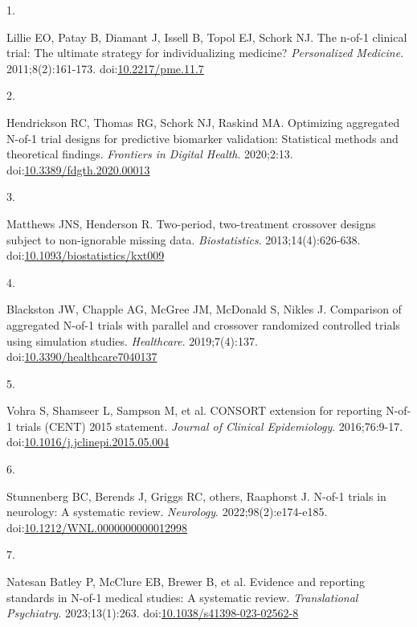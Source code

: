\documentclass[
  11pt,
]{article}
\newlength{\cslhangindent}
\newlength{\csllabelwidth}
\newenvironment{CSLReferences}[2] %
 {\begin{list}{}{%
  \setlength{\itemindent}{0pt}
  \setlength{\leftmargin}{0pt}
  \setlength{\parsep}{0pt}
  \ifodd #1
   \setlength{\leftmargin}{\cslhangindent}
   \setlength{\itemindent}{-1\cslhangindent}
  \fi
  \setlength{\itemsep}{#2\baselineskip}}}
 {\end{list}}
\newcommand{\CSLLeftMargin}[1]{\parbox[t]{\csllabelwidth}{\strut#1\strut}}
\newcommand{\CSLRightInline}[1]{\parbox[t]{\linewidth - \csllabelwidth}{\strut#1\strut}}
\begin{document}
\protect{}\label{refs}
\begin{CSLReferences}{0}{1}
\CSLLeftMargin{1. }%
\CSLRightInline{Lillie EO, Patay B, Diamant J, Issell B, Topol EJ, Schork NJ. The n-of-1 clinical trial: The ultimate strategy for individualizing medicine? \emph{Personalized Medicine}. 2011;8(2):161-173. doi:\href{https://doi.org/10.2217/pme.11.7}{10.2217/pme.11.7}}

\CSLLeftMargin{2. }%
\CSLRightInline{Hendrickson RC, Thomas RG, Schork NJ, Raskind MA. Optimizing aggregated {N}-of-1 trial designs for predictive biomarker validation: Statistical methods and theoretical findings. \emph{Frontiers in Digital Health}. 2020;2:13. doi:\href{https://doi.org/10.3389/fdgth.2020.00013}{10.3389/fdgth.2020.00013}}

\CSLLeftMargin{3. }%
\CSLRightInline{Matthews JNS, Henderson R. Two-period, two-treatment crossover designs subject to non-ignorable missing data. \emph{Biostatistics}. 2013;14(4):626-638. doi:\href{https://doi.org/10.1093/biostatistics/kxt009}{10.1093/biostatistics/kxt009}}

\CSLLeftMargin{4. }%
\CSLRightInline{Blackston JW, Chapple AG, McGree JM, McDonald S, Nikles J. Comparison of aggregated {N}-of-1 trials with parallel and crossover randomized controlled trials using simulation studies. \emph{Healthcare}. 2019;7(4):137. doi:\href{https://doi.org/10.3390/healthcare7040137}{10.3390/healthcare7040137}}

\CSLLeftMargin{5. }%
\CSLRightInline{{Vohra S, Shamseer L, Sampson M, et al.} {CONSORT} extension for reporting {N}-of-1 trials ({CENT}) 2015 statement. \emph{Journal of Clinical Epidemiology}. 2016;76:9-17. doi:\href{https://doi.org/10.1016/j.jclinepi.2015.05.004}{10.1016/j.jclinepi.2015.05.004}}

\CSLLeftMargin{6. }%
\CSLRightInline{{Stunnenberg BC, Berends J, Griggs RC, others, Raaphorst J}. {N}-of-1 trials in neurology: A systematic review. \emph{Neurology}. 2022;98(2):e174-e185. doi:\href{https://doi.org/10.1212/WNL.0000000000012998}{10.1212/WNL.0000000000012998}}

\CSLLeftMargin{7. }%
\CSLRightInline{Natesan Batley P, McClure EB, Brewer B, et al. Evidence and reporting standards in {N}-of-1 medical studies: A systematic review. \emph{Translational Psychiatry}. 2023;13(1):263. doi:\href{https://doi.org/10.1038/s41398-023-02562-8}{10.1038/s41398-023-02562-8}}


\end{CSLReferences}
\end{document}

